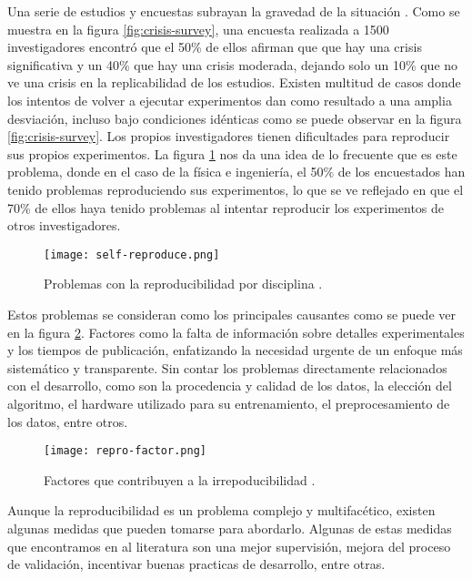 Una serie de estudios y encuestas subrayan la gravedad de la situación \cite{Baker_2016}.
Como se muestra en la figura \ref{fig:crisis-survey}, una encuesta realizada a 1500 investigadores
encontró que el 50\% de ellos afirman que que hay una crisis significativa y un 40\% que hay
una crisis moderada, dejando solo un 10\% que no ve una crisis en la replicabilidad de los estudios.
Existen multitud de casos donde los intentos de volver a ejecutar experimentos dan como resultado 
a una amplia desviación, incluso bajo condiciones idénticas como se puede observar en la figura \ref{fig:crisis-survey}.
Los propios investigadores tienen dificultades para reproducir sus propios experimentos.
La figura \ref{fig:self-reproduce} nos da una idea de lo frecuente que es este problema,
donde en el caso de la física e ingeniería, el 50\% de los encuestados han tenido problemas
reproduciendo sus experimentos, lo que se ve reflejado en que el 70\% de ellos haya tenido
problemas al intentar reproducir los experimentos de otros investigadores.

\begin{figure}[ht]
    \centering
    \texttt{[image: self-reproduce.png]}
    \caption{Problemas con la reproducibilidad por disciplina \cite{Baker_2016}.}
    \label{fig:self-reproduce}
\end{figure}

Estos problemas se consideran como los principales causantes como se puede ver en la figura \ref{fig:repro-factor}.
Factores como la falta de información sobre detalles experimentales y los tiempos de pu\-bli\-cación, enfatizando 
la necesidad urgente de un enfoque más sistemático y transparente. Sin contar los problemas
directamente relacionados con el desarrollo, como son la procedencia y calidad de los datos, la 
elección del algoritmo, el hardware utilizado para su entrenamiento, el preprocesamiento de 
los datos, entre otros.

\begin{figure}[ht]
    \centering
    \texttt{[image: repro-factor.png]}
    \caption{Factores que contribuyen a la irrepoducibilidad \cite{Baker_2016}.}
    \label{fig:repro-factor}
\end{figure}

Aunque la reproducibilidad es un problema complejo y multifacético, existen
algunas medidas que pueden tomarse para abordarlo. Algunas de estas medidas que encontramos
en al literatura son una mejor supervisión, mejora del proceso de validación, incentivar
buenas practicas de desarrollo, entre otras. 

